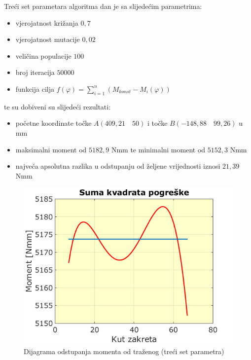 \quad Treći set parametara algoritma dan je sa slijedećim parametrima: 
\begin{itemize}
\item vjerojatnost križanja $0,7$
\item vjerojatnost mutacije $0,02$
\item veličina populacije $100$
\item broj iteracija $50000$
\item funkcija cilja $f(\varphi)=\sum_{i=1}^{n}\left( M_{konst}-M_i(\varphi) \right)$
\end{itemize}
te su dobiveni su slijedeći rezultati:
\begin{itemize}
\item početne koordinate točke $A(409,21\quad 50)$ i točke $B(-148,88\quad  99,26)$ u mm
\item maksimalni moment od $5182,9$  Nmm te minimalni moment od $5152,3$  Nmm
\item najveća apsolutna razlika u odstupanju od željene vrijednosti iznosi $21,39$ Nmm
\end{itemize}


\begin{figure}[h!]
\center
\includegraphics[scale=.6]{slike/sum_m1.png}
\caption{Dijagrama odstupanja momenta od traženog (treći set parametra)}
\label{fig:sum_m1}
\end{figure}

